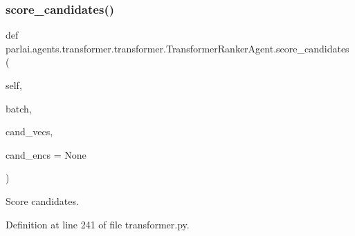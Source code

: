 \subsubsection{\texorpdfstring{score\+\_\+candidates()}{score\_candidates()}}
{\footnotesize\ttfamily def parlai.\+agents.\+transformer.\+transformer.\+Transformer\+Ranker\+Agent.\+score\+\_\+candidates (\begin{DoxyParamCaption}\item[{}]{self,  }\item[{}]{batch,  }\item[{}]{cand\+\_\+vecs,  }\item[{}]{cand\+\_\+encs = {\ttfamily None} }\end{DoxyParamCaption})}

\begin{DoxyVerb}Score candidates.\end{DoxyVerb}
 

Definition at line 241 of file transformer.\+py.



